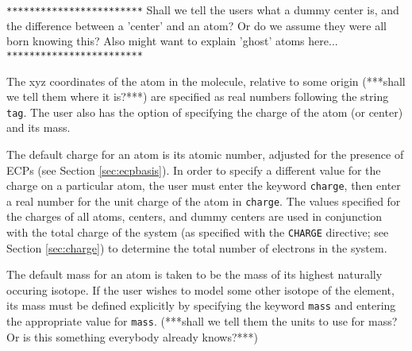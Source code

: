 \verb+************************+
Shall we tell the users what a dummy center is, and the difference
between a 'center' and an atom?  Or do we assume they were all born
knowing this?  Also might want to explain 'ghost' atoms here...
\verb+************************+

The xyz coordinates of the atom in the molecule, relative to some origin
(***shall we tell them where it is?***) are specified as real numbers 
following the string \verb+tag+.  The user also has the option of 
specifying the charge of the atom (or center) and its mass.  

The default charge for an
atom is its atomic number, adjusted for the presence of ECPs (see Section
\ref{sec:ecpbasis}).  In order to specify a different value for the
charge on a particular atom, the user must enter
the keyword \verb+charge+, then enter a real number for the unit charge
of the atom in \verb+charge+.  The values specified for the charges of 
all atoms, centers, and
dummy centers are used in conjunction with the 
total charge of the system (as specified with the \verb+CHARGE+ directive; 
see Section 
\ref{sec:charge}) to determine the total number of electrons in the system.

The default mass for an atom is taken to be the mass of its highest naturally
occuring isotope.  If the user wishes to model some other isotope of the
element, its mass must be defined explicitly by specifying the keyword 
\verb+mass+ and entering the appropriate value for \verb+mass+.  (***shall
we tell them the units to use for mass?  Or is this something everybody
already knows?***)


